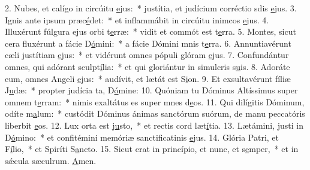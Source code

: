 2. Nubes, et calígo in circúitu \uline{e}jus:~* justítia, et judícium corréctio sdis \uline{e}jus.
3. Ignis ante ipsum præc\uline{é}det:~* et inflammábit in circúitu inimcos \uline{e}jus.
4. Illuxérunt fúlgura ejus orbi t\uline{e}rræ:~* vidit et commót est t\uline{e}rra.
5. Montes, sicut cera fluxérunt a fácie D\uline{ó}mini:~* a fácie Dómini mnis t\uline{e}rra.
6. Annuntiavérunt cæli justítiam \uline{e}jus:~* et vidérunt omnes pópuli glóram \uline{e}jus.
7. Confundántur omnes, qui adórant sculpt\uline{í}lia:~* et qui gloriántur in simulcris s\uline{u}is.
8. Adoráte eum, omnes Angeli \uline{e}jus:~* audívit, et lætát est S\uline{i}on.
9. Et exsultavérunt fíliæ J\uline{u}dæ:~* propter judícia ta, D\uline{ó}mine:
10. Quóniam tu Dóminus Altíssimus super omnem t\uline{e}rram:~* nimis exaltátus es super mnes d\uline{e}os.
11. Qui dilígitis Dóminum, odíte m\uline{a}lum:~* custódit Dóminus ánimas sanctórum suórum, de manu peccatóris liberbit \uline{e}os.
12. Lux orta est j\uline{u}sto,~* et rectis cord læt\uline{í}tia.
13. Lætámini, justi in D\uline{ó}mino:~* et confitémini memóriæ sanctificatinis \uline{e}jus.
14. Glória Patri, et F\uline{í}lio,~* et Spiríti S\uline{a}ncto.
15. Sicut erat in princípio, et nunc, et s\uline{e}mper,~* et in sǽcula sæculrum. \uline{A}men.
